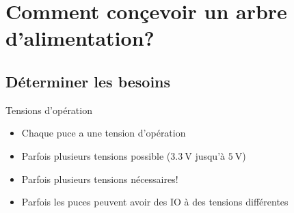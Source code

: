 
\section{Comment conçevoir un arbre d'alimentation?}

\subsection{Déterminer les besoins}

\begin{frame}{Tensions d'opération}
    \begin{itemize}
        \item Chaque puce a une tension d'opération
        \item Parfois plusieurs tensions possible ($\SI{3.3}{\volt}$ jusqu'à $\SI{5}{\volt}$)
        \item Parfois plusieurs tensions nécessaires!
        \bigskip
        \item Parfois les puces peuvent avoir des IO à des tensions différentes
    \end{itemize}
\end{frame}

